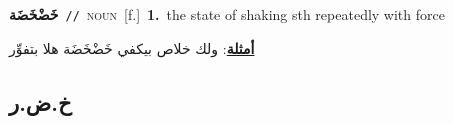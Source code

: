 \documentclass[10pt,a4paper,twoside]{article} %
\begin{document}
\begin{multicols}{2}
{\setlength\topsep{0pt}\textbf{\foreignlanguage{arabic}{خَضْخَضَة}}\ {\color{gray}\texttt{//}\color{black}}\ \textsc{noun}\ [f.]\ \textbf{1.}~the state of shaking sth repeatedly with force\  \begin{flushright}\color{gray}\foreignlanguage{arabic}{\textbf{\underline{\foreignlanguage{arabic}{أمثلة}}}: ولك خلاص بيكفي خَضْخَضَة هلا بتفوِّر}\end{flushright}\color{black}} \vspace{2mm}

\vspace{-3mm}
\subsection*{\color{blue}\foreignlanguage{arabic}{خ.ض.ر}\color{blue}{}} 


\end{multicols}
\end{document}
